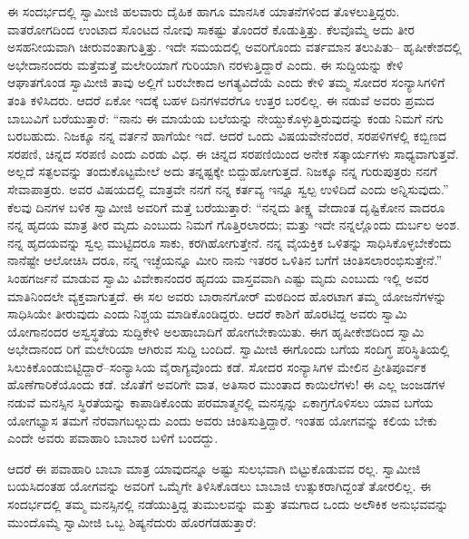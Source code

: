 ಈ ಸಂದರ್ಭದಲ್ಲಿ ಸ್ವಾಮೀಜಿ ಹಲವಾರು ದೈಹಿಕ ಹಾಗೂ ಮಾನಸಿಕ ಯಾತನೆಗಳಿಂದ ತೊಳಲುತ್ತಿದ್ದರು. ವಾತರೋಗದಿಂದ ಉಂಟಾದ ಸೊಂಟದ ನೋವು ಸಾಕಷ್ಟು ತೊಂದರೆ ಕೊಡುತ್ತಿತ್ತು. ಕೆಲವೊಮ್ಮೆ ಅದು ತೀರ ಅಸಹನೀಯವಾಗಿ ಚೀರುವಂತಾಗುತ್ತಿತ್ತು. ಇದೇ ಸಮಯದಲ್ಲಿ ಅವರಿಗೊಂದು ವರ್ತಮಾನ ತಲುಪಿತು– ಹೃಷೀಕೇಶದಲ್ಲಿ ಅಭೇದಾನಂದರು ಮತ್ತೆಮತ್ತೆ ಮಲೇರಿಯಾಗೆ ಗುರಿಯಾಗಿ ನರಳುತ್ತಿದ್ದಾರೆ ಎಂದು. ಈ ಸುದ್ದಿಯನ್ನು ಕೇಳಿ ಆಘಾತಗೊಂಡ ಸ್ವಾಮೀಜಿ ತಾವು ಅಲ್ಲಿಗೆ ಬರಬೇಕಾದ ಅಗತ್ಯವಿದೆಯೆ ಎಂದು ಕೇಳಿ ತಮ್ಮ ಸೋದರ ಸಂನ್ಯಾಸಿಗಳಿಗೆ ತಂತಿ ಕಳಿಸಿದರು. ಆದರೆ ಏಕೋ ಇದಕ್ಕೆ ಬಹಳ ದಿನಗಳವರೆಗೂ ಉತ್ತರ ಬರಲಿಲ್ಲ. ಈ ನಡುವೆ ಅವರು ಪ್ರಮದ ಬಾಬುವಿಗೆ ಬರೆಯುತ್ತಾರೆ: “ನಾನು ಈ ಮಾಯೆಯ ಬಲೆಯನ್ನು ನೇಯ್ದುಕೊಳ್ಳುತ್ತಿರುವುದನ್ನು ಕಂಡು ನಿಮಗೆ ನಗು ಬರಬಹುದು. ನಿಜಕ್ಕೂ ನನ್ನ ವರ್ತನೆ ಹಾಗೆಯೇ ಇದೆ. ಆದರೆ ಒಂದು ವಿಷಯವೇನೆಂದರೆ, ಸರಪಳಿಗಳಲ್ಲಿ ಕಬ್ಬಿಣದ ಸರಪಣಿ, ಚಿನ್ನದ ಸರಪಣಿ ಎಂದು ಎರಡು ವಿಧ. ಈ ಚಿನ್ನದ ಸರಪಣಿಯಿಂದ ಅನೇಕ ಸತ್ಕಾರ್ಯಗಳು ಸಾಧ್ಯವಾಗುತ್ತವೆ. ಅಲ್ಲದೆ ಸತ್ಫಲವನ್ನು ತಂದುಕೊಟ್ಟಮೇಲೆ ಅದು ತನ್ನಷ್ಟಕ್ಕೇ ಬಿದ್ದುಹೋಗುತ್ತದೆ. ನಿಜಕ್ಕೂ ನನ್ನ ಗುರುಪುತ್ರರು ನನಗೆ ಸೇವಾಪಾತ್ರರು. ಅವರ ವಿಷಯದಲ್ಲಿ ಮಾತ್ರವೇ ನನಗೆ ನನ್ನ ಕರ್ತವ್ಯ ಇನ್ನೂ ಸ್ವಲ್ಪ ಉಳಿದಿದೆ ಎಂದು ಅನ್ನಿಸುವುದು.” ಕೆಲವು ದಿನಗಳ ಬಳಿಕ ಸ್ವಾಮೀಜಿ ಅವರಿಗೆ ಮತ್ತೆ ಬರೆಯುತ್ತಾರೆ: “ನನ್ನದು ತೀಕ್ಷ್ಣ ವೇದಾಂತ ದೃಷ್ಟಿಕೋನ ವಾದರೂ ನನ್ನ ಹೃದಯ ಮಾತ್ರ ತೀರ ಮೃದು ಎಂಬುದು ನಿಮಗೆ ಗೊತ್ತಿರಲಾರದು; ಮತ್ತು ಇದೇ ನನ್ನಲ್ಲೊಂದು ದುರ್ಬಲ ಅಂಶ. ನನ್ನ ಹೃದಯವನ್ನು ಸ್ವಲ್ಪ ಮುಟ್ಟಿದರೂ ಸಾಕು, ಕರಗಿಹೋಗುತ್ತೇನೆ. ನನ್ನ ವೈಯಕ್ತಿಕ ಒಳಿತನ್ನು ಸಾಧಿಸಿಕೊಳ್ಳಬೇಕೆಂದು ನಾನೆಷ್ಟೇ ಆಲೋಚಿಸಿ ದರೂ, ನನ್ನ ಇಚ್ಛೆಯನ್ನೂ ಮೀರಿ ನಾನು ಇತರರ ಒಳಿತಿನ ಬಗೆಗೆ ಚಿಂತಿಸಲಾರಂಭಿಸುತ್ತೇನೆ.” ಸಿಂಹಗರ್ಜನೆ ಮಾಡುವ ಸ್ವಾಮಿ ವಿವೇಕಾನಂದರ ಹೃದಯ ವಾಸ್ತವವಾಗಿ ಎಷ್ಟು ಮೃದು ಎಂಬುದು ಇಲ್ಲಿ ಅವರ ಮಾತಿನಿಂದಲೇ ವ್ಯಕ್ತವಾಗುತ್ತದೆ. ಈ ಸಲ ಅವರು ಬಾರಾನಗೋರ್ ಮಠದಿಂದ ಹೊರಟಾಗ ತಮ್ಮ ಯೋಜನೆಗಳನ್ನು ಸಾಧಿಸಿಯೇ ತೀರುವುದು ಎಂದು ನಿಶ್ಚಯ ಮಾಡಿಕೊಂಡಿದ್ದರು. ಆದರೆ ಕಾಶಿಗೆ ಹೊರಟಿದ್ದ ಅವರು ಸ್ವಾಮಿ ಯೋಗಾನಂದರ ಅಸ್ವಸ್ಥತೆಯ ಸುದ್ದಿಕೇಳಿ ಅಲಹಾಬಾದಿಗೆ ಹೋಗಬೇಕಾಯಿತು. ಈಗ ಹೃಷೀಕೇಶದಿಂದ ಸ್ವಾಮಿ ಅಭೇದಾನಂದ ರಿಗೆ ಮಲೇರಿಯಾ ಆಗಿರುವ ಸುದ್ದಿ ಬಂದಿದೆ. ಸ್ವಾಮೀಜಿ ಈಗೊಂದು ಬಗೆಯ ಸಂದಿಗ್ಧ ಪರಿಸ್ಥಿತಿಯಲ್ಲಿ ಸಿಲುಕಿಕೊಂಡುಬಿಟ್ಟಿದ್ದಾರೆ–ಸಂನ್ಯಾಸಿಯ ವೈರಾಗ್ಯವೊಂದು ಕಡೆ. ಸೋದರ ಸಂನ್ಯಾಸಿಗಳ ಮೇಲಿನ ಪ್ರೀತಿಪೂರ್ವಕ ಹೊಣೆಗಾರಿಕೆಯೊಂದು ಕಡೆ. ಜೊತೆಗೆ ಅವರಿಗೇ ವಾತ, ಅತಿಸಾರ ಮುಂತಾದ ಕಾಯಿಲೆಗಳು! ಈ ಎಲ್ಲ ಜಂಜಡಗಳ ನಡುವೆ ಮನಸ್ಸಿನ ಸ್ಥಿರತೆಯನ್ನು ಕಾಪಾಡಿಕೊಂಡು ಪರಮಾತ್ಮನಲ್ಲಿ ಮನಸ್ಸನ್ನು ಏಕಾಗ್ರಗೊಳಿಸಲು ಯಾವ ಬಗೆಯ ಯೋಗಭ್ಯಾಸ ತಮಗೆ ನೆರವಾಗಬಲ್ಲುದು ಎಂದು ಅವರು ಚಿಂತಿಸುತ್ತಿದ್ದಾರೆ. ಇಂತಹ ಯೋಗವನ್ನು ಕಲಿಯ ಬೇಕು ಎಂದೇ ಅವರು ಪವಾಹಾರಿ ಬಾಬಾರ ಬಳಿಗೆ ಬಂದದ್ದು.

ಆದರೆ ಈ ಪವಾಹಾರಿ ಬಾಬಾ ಮಾತ್ರ ಯಾವುದನ್ನೂ ಅಷ್ಟು ಸುಲಭವಾಗಿ ಬಿಟ್ಟುಕೊಡುವವ ರಲ್ಲ. ಸ್ವಾಮೀಜಿ ಬಯಸಿದಂತಹ ಯೋಗವನ್ನು ಅವರಿಗೆ ಒಮ್ಮೆಗೇ ತಿಳಿಸಿಕೊಡಲು ಬಾಬಾಜಿ ಉತ್ಸುಕರಾಗಿದ್ದಂತೆ ತೋರಲಿಲ್ಲ. ಈ ಸಂದರ್ಭದಲ್ಲಿ ತಮ್ಮ ಮನಸ್ಸಿನಲ್ಲಿ ನಡೆಯುತ್ತಿದ್ದ ತುಮುಲವನ್ನು ಮತ್ತು ತಮಗಾದ ಒಂದು ಅಲೌಕಿಕ ಅನುಭವವನ್ನು ಮುಂದೊಮ್ಮೆ ಸ್ವಾಮೀಜಿ ಒಬ್ಬ ಶಿಷ್ಯನೆದುರು ಹೊರಗೆಡಹುತ್ತಾರೆ:

